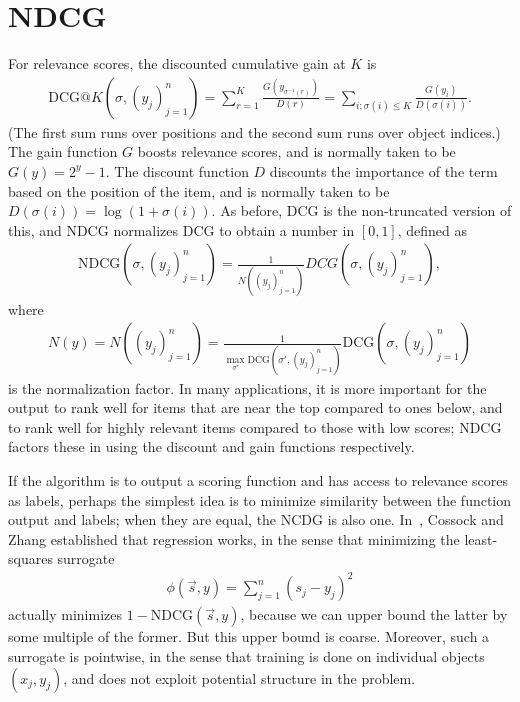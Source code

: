 \section{NDCG}
\label{sec:ndcg}
For relevance scores, the discounted cumulative gain at $K$ is 
\begin{align*}
  \text{DCG}@K(\sigma, (y_j)_{j=1}^n)
  = \sum_{r=1}^K \frac{G(y_{\sigma^{-1}(r)})}{D(r)}
  = \sum_{i: \sigma(i) \leq K} \frac{G(y_i)}{D(\sigma(i))}.
\end{align*}
(The first sum runs over positions and the second sum runs over
object indices.) The gain function $G$ boosts relevance scores, and is
normally taken to be $G(y) = 2^y - 1$. The discount function $D$ discounts
the importance of the term based on the position of the item, and is
normally taken to be $D(\sigma(i)) = \log(1 + \sigma(i))$. As before, DCG
is the non-truncated version of this, and NDCG normalizes DCG to obtain
a number in $[0,1]$, defined as
\begin{align*}
  \text{NDCG}(\sigma, (y_j)_{j=1}^n)
  = \frac{1}{N((y_j)_{j=1}^n)} DCG(\sigma, (y_j)_{j=1}^n),
\end{align*}
where
\begin{align*}
  N(y) = N((y_j)_{j=1}^n)
  = \frac{1}{\max_{\sigma'} \text{DCG}(\sigma', (y_j)_{j=1}^n)} \text{DCG}(\sigma, (y_j)_{j=1}^n)
\end{align*}
is the normalization factor. 
In many applications, it is more important for the output to rank well for
items that are near the top compared to ones below, and to rank well for
highly relevant items compared to those with low scores; NDCG factors
these in using the discount and gain functions respectively.

If the algorithm is to output a scoring function and has access to relevance
scores as labels, perhaps the simplest idea is to minimize similarity between
the function output and labels; when they are equal, the NCDG is also one.
In~\cite{cossock2008subset}, Cossock and Zhang
established that regression works, in the sense that minimizing the least-squares
surrogate
\begin{align*}
  \phi(\vec{s}, y) = \sum_{j=1}^n {(s_j - y_j)}^2
\end{align*}
actually minimizes $1 - \text{NDCG}(\vec{s}, y)$, because we can upper bound
the latter by some multiple of the former. But this upper bound is coarse.
Moreover, such a surrogate is pointwise, in the sense
that training is done on individual objects $(x_j, y_j)$, and does not
exploit potential structure in the problem.

